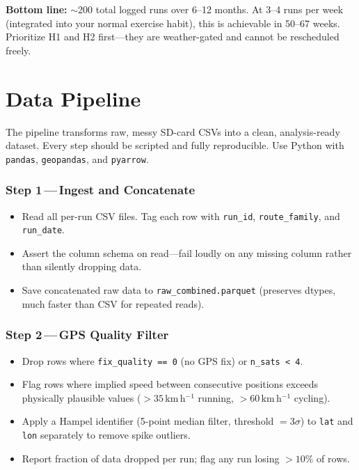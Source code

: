 \documentclass[11pt, letterpaper]{article}
\begin{document}
\medskip
\textbf{Bottom line:} $\sim$200 total logged runs over 6--12 months. At 3--4 runs per week
(integrated into your normal exercise habit), this is achievable in 50--67 weeks. Prioritize H1
and H2 first---they are weather-gated and cannot be rescheduled freely.

\newpage

\section{Data Pipeline}

The pipeline transforms raw, messy SD-card CSVs into a clean, analysis-ready dataset. Every step
should be scripted and fully reproducible. Use Python with \texttt{pandas}, \texttt{geopandas},
and \texttt{pyarrow}.

\subsubsection{Step 1\,---\,Ingest and Concatenate}
\begin{itemize}
  \item Read all per-run CSV files. Tag each row with \texttt{run\_id}, \texttt{route\_family}, and \texttt{run\_date}.
  \item Assert the column schema on read---fail loudly on any missing column rather than silently dropping data.
  \item Save concatenated raw data to \texttt{raw\_combined.parquet} (preserves dtypes, much faster than CSV for repeated reads).
\end{itemize}

\subsubsection{Step 2\,---\,GPS Quality Filter}
\begin{itemize}
  \item Drop rows where \texttt{fix\_quality\,==\,0} (no GPS fix) or \texttt{n\_sats\,<\,4}.
  \item Flag rows where implied speed between consecutive positions exceeds physically plausible values ($>35$\,km\,h$^{-1}$ running, $>60$\,km\,h$^{-1}$ cycling).
  \item Apply a Hampel identifier (5-point median filter, threshold $= 3\sigma$) to \texttt{lat} and \texttt{lon} separately to remove spike outliers.
  \item Report fraction of data dropped per run; flag any run losing $>10\%$ of rows.
\end{itemize}
\end{document}
